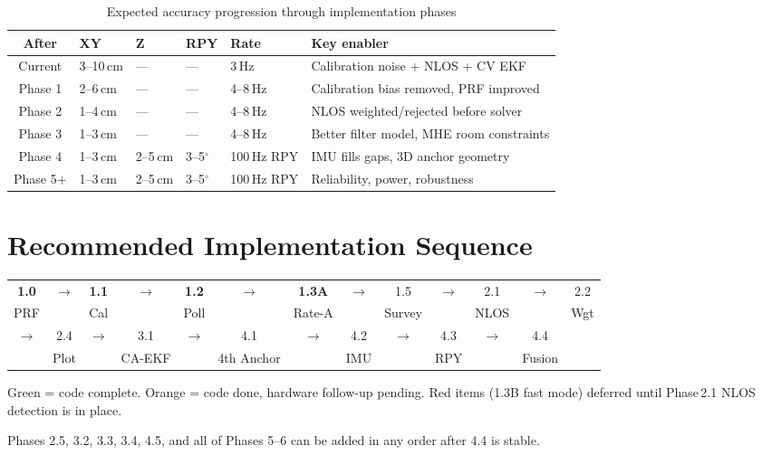 \documentclass[11pt,a4paper]{article}
\begin{document}
\begin{table}[ht]
\centering
\caption{Expected accuracy progression through implementation phases}
\renewcommand{\arraystretch}{1.3}
\begin{tabular}{cllllp{5cm}}
\toprule
\textbf{After} & \textbf{XY} & \textbf{Z} & \textbf{RPY} & \textbf{Rate} & \textbf{Key enabler} \\
\midrule
Current  & 3--10\,cm & ---      & ---         & 3\,Hz       & Calibration noise + NLOS + CV EKF \\
Phase 1  & 2--6\,cm  & ---      & ---         & 4--8\,Hz    & Calibration bias removed, PRF improved \\
Phase 2  & 1--4\,cm  & ---      & ---         & 4--8\,Hz    & NLOS weighted/rejected before solver \\
Phase 3  & 1--3\,cm  & ---      & ---         & 4--8\,Hz    & Better filter model, MHE room constraints \\
Phase 4  & 1--3\,cm  & 2--5\,cm & 3--5$^\circ$ & 100\,Hz RPY & IMU fills gaps, 3D anchor geometry \\
Phase 5+ & 1--3\,cm  & 2--5\,cm & 3--5$^\circ$ & 100\,Hz RPY & Reliability, power, robustness \\
\bottomrule
\end{tabular}
\end{table}

\section{Recommended Implementation Sequence}

\begin{center}
\renewcommand{\arraystretch}{1.4}
\begin{tabular}{ccccccccccccc}
\textcolor{dkgreen}{\textbf{1.0}} & $\to$ & \textcolor{dkgreen}{\textbf{1.1}} & $\to$ & \textcolor{dkgreen}{\textbf{1.2}} & $\to$ & \textcolor{dkgreen}{\textbf{1.3A}} & $\to$ & 1.5 & $\to$ & 2.1 & $\to$ & 2.2 \\
\textcolor{dkgreen}{PRF} && \textcolor{dkgreen}{Cal} && \textcolor{dkgreen}{Poll} && \textcolor{dkgreen}{Rate-A} && Survey && NLOS && Wgt \\[4pt]
$\to$ & 2.4 & $\to$ & 3.1 & $\to$ & 4.1 & $\to$ & 4.2 & $\to$ & 4.3 & $\to$ & 4.4 & \\
& Plot && CA-EKF && 4th Anchor && IMU && RPY && Fusion &
\end{tabular}
\end{center}

\medskip
\noindent\textcolor{dkgreen}{Green} = code complete. \textcolor{dkorange}{Orange} = code done, hardware follow-up pending.
\textcolor{dkred}{Red} items (1.3B fast mode) deferred until Phase\,2.1 NLOS detection is in place.

\bigskip
Phases 2.5, 3.2, 3.3, 3.4, 4.5, and all of Phases 5--6 can be added in any order after 4.4 is stable.
\end{document}
